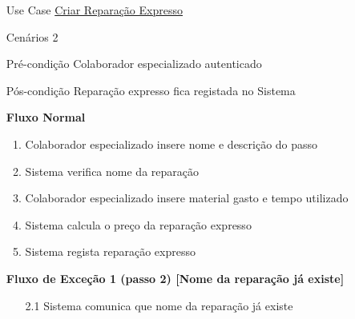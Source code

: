 \documentclass[../relatorio.tex]{subfiles}
\begin{document}
\begin{itemize}
    \item[Use Case] {\underline{Criar Reparação Expresso}}
    \item[Cenários] {2}
    \item[Pré-condição] {Colaborador especializado autenticado}
    \item[Pós-condição] {Reparação expresso fica registada no Sistema}
          \begin{flushleft}
              \textbf{Fluxo Normal}
          \end{flushleft}
          \begin{enumerate}
              \item Colaborador especializado insere nome e descrição do passo
              \item Sistema verifica nome da reparação
              \item Colaborador especializado insere material gasto e tempo utilizado
              \item Sistema calcula o preço da reparação expresso
              \item Sistema regista reparação expresso
          \end{enumerate}
          \begin{flushleft}
            \textbf{Fluxo de Exceção 1 (passo 2) [Nome da reparação já existe]}
        \end{flushleft}
        \begin{itemize}
            \item[2.1] Sistema comunica que nome da reparação já existe
        \end{itemize}
\end{itemize}
\end{document}

